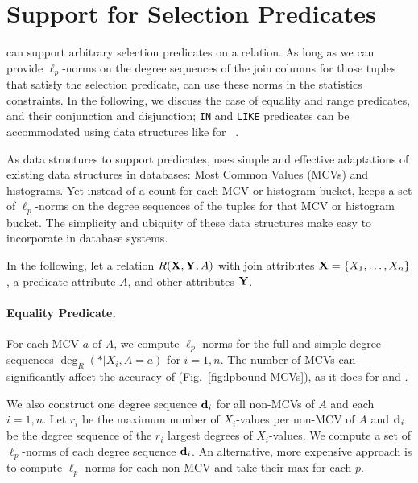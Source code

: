 \section{Support for Selection Predicates}
\label{sec:histograms}

\system can support arbitrary selection predicates on a relation. As long as we can provide $\ell_p$-norms on the degree sequences of the join columns for those tuples that satisfy the selection predicate, \system can use these norms in the statistics constraints. In the following, we discuss the case of equality and range predicates, and their conjunction and disjunction; \texttt{IN} and \texttt{LIKE} predicates can be accommodated using data structures like for \safebound~\cite{SafeBound:SIGMOD23}.

As data structures to support predicates, \system uses simple and effective adaptations of existing data structures in databases: Most Common Values (MCVs) and histograms. Yet instead of a count for each MCV or histogram bucket, \system keeps a set of $\ell_p$-norms on the degree sequences of the tuples for that MCV or histogram bucket. The simplicity and ubiquity of these data structures make \system easy to incorporate in database systems.

In the following, let a relation $R({\bf X},{\bf Y},A)$ with join attributes ${\bf X} = \{X_1,\ldots,X_n\}$, a predicate attribute $A$, and other attributes ${\bf Y}$.

\paragraph{Equality Predicate.} For each MCV $a$ of $A$, we compute $\ell_p$-norms for the full and simple degree sequences $\deg_R(*|X_i, A=a)$ for $i=1,n$. The number of MCVs can significantly affect the accuracy of \system (Fig.~\ref{fig:lpbound-MCVs}), as it does for \safebound and \psql. 

We also construct one degree sequence ${\bf d}_i$ for all non-MCVs of $A$ and each $i=1,n$. Let $r_i$ be the maximum number of $X_i$-values per non-MCV of $A$ and ${\bf d}_i$ be the degree sequence of the $r_i$ largest degrees of $X_i$-values.  We compute a set of $\ell_p$-norms of each degree sequence ${\bf d}_i$. An alternative, more expensive approach is to compute $\ell_p$-norms for each non-MCV and take their max for each $p$. 

